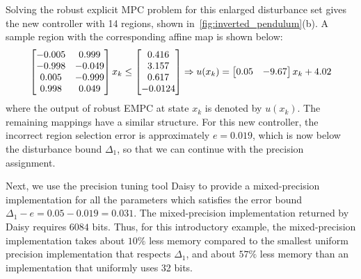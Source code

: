 %
Solving the robust explicit MPC problem for this enlarged disturbance set gives the new controller
with 14 regions, shown in~\autoref{fig:inverted_pendulum}(b).
A sample region with the corresponding affine map is shown below:
\begin{equation*}
\resizebox{.9\hsize}{!}{$
\begin{bmatrix}
-0.005  &0.999\\
-0.998  &-0.049\\
0.005  &-0.999\\
0.998   &0.049
\end{bmatrix}x_k\leq 
\begin{bmatrix}
0.416\\
3.157\\
0.617\\
-0.0124
\end{bmatrix}
\Rightarrow
u(x_k)=\begin{bmatrix}
0.05&-9.67
\end{bmatrix}x_k+4.02$}
\end{equation*}
where the output of robust EMPC at state $x_k$ is denoted by $u(x_k)$. 
The remaining mappings have a similar structure.
For this new controller, the incorrect region selection error is 
approximately $e = 0.019$, which is now below the disturbance bound $\Delta_1$,
so that we can continue with the precision assignment.


Next, we use the precision tuning tool Daisy \cite{Daisy} to provide a mixed-precision 
implementation for all the parameters which satisfies the error bound $\Delta_1  - e = 0.05 - 0.019 = 0.031$.
The mixed-precision implementation returned by Daisy requires $6084$ bits.
Thus, for this introductory example, the mixed-precision implementation takes about $10\%$ less memory compared 
to the smallest uniform precision implementation that respects $\Delta_1$,
and about $57\%$ less memory than an implementation that uniformly uses
32 bits.

	
	
